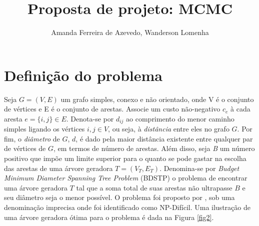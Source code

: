 \documentclass[12pt]{article}
\title{Proposta de projeto: MCMC}
\author{Amanda Ferreira de Azevedo\inst{1}, Wanderson Lomenha\inst{1}}
\begin{document}
 

\maketitle

%     

\section{Definição do problema}


Seja $G = (V, E)$ um grafo simples, conexo e não orientado, onde V é o conjunto de vértices e E é o conjunto de arestas. Associe um custo não-negativo $c_e$ à cada aresta $e = \{i,j\} \in E$. Denota-se por $d_{ij}$ ao comprimento do menor caminho simples ligando os vértices $i,j \in V$, ou seja, à \textit{distância} entre eles no grafo $G$. Por fim, o \textit{diâmetro} de $G$, $d$, é dado pela maior distância existente entre qualquer par de vértices de $G$, em termos de número de arestas. Além disso, seja \textit{B} um número positivo que impõe um limite superior para o quanto se pode gastar na escolha das arestas de uma árvore geradora $T = (V_T, E_T)$. Denomina-se por \textit{Budget Minimum Diameter Spanning Tree Problem} (BDSTP) o problema de encontrar uma árvore geradora $T$ tal que a soma total de suas arestas não ultrapasse $B$ e seu diâmetro seja o menor possível. O problema foi proposto por \cite{Plesnik1981}, sob uma denominação imprecisa onde foi identificado como NP-Difícil. Uma ilustração de uma árvore geradora ótima para o problema é dada na Figura \ref{fig2}. 
\end{document}
